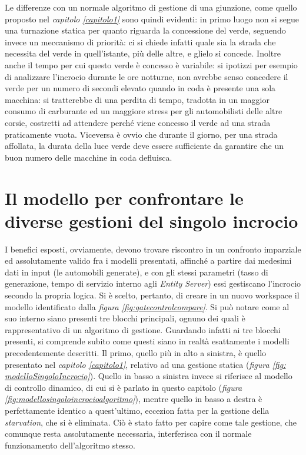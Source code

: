 Le differenze con un normale algoritmo di gestione di una giunzione, come quello proposto nel \textit{capitolo \ref{capitolo1}} sono quindi evidenti: in primo luogo non si segue una turnazione statica per quanto riguarda la concessione del verde, seguendo invece un meccanismo di priorità: ci si chiede infatti quale sia la strada che necessita del verde in quell'istante, più delle altre, e glielo si concede. Inoltre anche il tempo per cui questo verde è concesso è variabile: si ipotizzi per esempio di analizzare l'incrocio durante le ore notturne, non avrebbe senso concedere il verde per un numero di secondi elevato quando in coda è presente una sola macchina: si tratterebbe di una perdita di tempo, tradotta in un maggior consumo di carburante ed un maggiore stress per gli automobilisti delle altre corsie, costretti ad attendere perché viene concesso il verde ad una strada praticamente vuota. Viceversa è ovvio che durante il giorno, per una strada affollata, la durata della luce verde deve essere sufficiente da garantire che un buon numero delle macchine in coda defluisca.
\newpage

\section{Il modello per confrontare le diverse gestioni del singolo incrocio}

I benefici esposti, ovviamente, devono trovare riscontro in un confronto imparziale ed assolutamente valido fra i modelli presentati, affinché a partire dai medesimi dati in input (le automobili generate), e con gli stessi parametri (tasso di generazione, tempo di servizio interno agli \textit{Entity Server}) essi gestiscano l'incrocio secondo la propria logica. Si è scelto, pertanto, di creare in un nuovo workspace il modello identificato dalla \textit{figura \ref{fig:gatecontrolcompare}}. Si può notare come al suo interno siano presenti tre blocchi principali, ognuno dei quali è rappresentativo di un algoritmo di gestione. Guardando infatti ai tre blocchi presenti, si comprende subito come questi siano in realtà esattamente i modelli precedentemente descritti. Il primo, quello più in alto a sinistra, è quello presentato nel \textit{capitolo \ref{capitolo1}}, relativo ad una gestione statica (\textit{figura \ref{fig: modelloSingoloIncrocio}}). Quello in basso a sinistra invece si riferisce al modello di controllo dinamico, di cui si è parlato in questo capitolo (\textit{figura \ref{fig:modellosingoloincrocioalgoritmo}}), mentre quello in basso a destra è perfettamente identico a quest'ultimo, eccezion fatta per la gestione della \textit{starvation}, che si è eliminata. Ciò è stato fatto per capire come tale gestione, che comunque resta assolutamente necessaria, interferisca con il normale funzionamento dell'algoritmo stesso.

